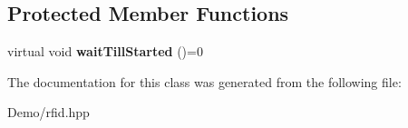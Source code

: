 \subsection*{Protected Member Functions}
\begin{DoxyCompactItemize}
\item 
\mbox{\label{classrfid_aa8c64df0877a6bad52b08cfdcaea02bc}} 
virtual void {\bfseries wait\+Till\+Started} ()=0
\end{DoxyCompactItemize}


The documentation for this class was generated from the following file\+:\begin{DoxyCompactItemize}
\item 
Demo/rfid.\+hpp\end{DoxyCompactItemize}
